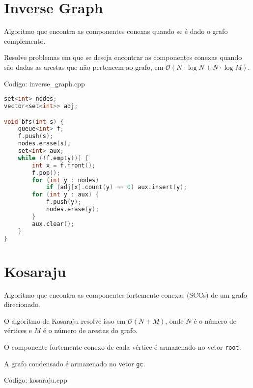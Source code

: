 \documentclass[10pt, a4paper, oneside]{book}
\begin{document}
\hfill

\section{Inverse Graph}


Algoritmo que encontra as componentes conexas quando se é dado o grafo complemento.



Resolve problemas em que se deseja encontrar as componentes conexas quando são dadas as arestas que não pertencem ao grafo, em $\mathcal{O}(N \cdot \log N + N \cdot \log M)$.
\hfill

Codigo: inverse\_graph.cpp

\begin{lstlisting}[language=C++]
set<int> nodes;
vector<set<int>> adj;

void bfs(int s) {
    queue<int> f;
    f.push(s);
    nodes.erase(s);
    set<int> aux;
    while (!f.empty()) {
        int x = f.front();
        f.pop();
        for (int y : nodes)
            if (adj[x].count(y) == 0) aux.insert(y);
        for (int y : aux) {
            f.push(y);
            nodes.erase(y);
        }
        aux.clear();
    }
}
\end{lstlisting}
\hfill

\section{Kosaraju}


Algoritmo que encontra as componentes fortemente conexas (SCCs) de um grafo direcionado.

O algoritmo de Kosaraju resolve isso em $\mathcal{O}(N + M)$, onde $N$ é o número de vértices e $M$ é o número de arestas do grafo.



O componente fortemente conexo de cada vértice é armazenado no vetor \texttt{root}.

A grafo condensado é armazenado no vetor \texttt{gc}.

\hfill

Codigo: kosaraju.cpp
\end{document}
